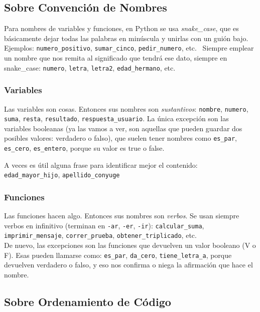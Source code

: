 \documentclass[
  letterpaper,
  DIV=11,
  numbers=noendperiod]{scrreprt}
\begin{document}
\subsection{Sobre Convención de
Nombres}\label{sobre-convenciuxf3n-de-nombres}

Para nombres de variables y funciones, en Python se usa
\emph{snake\_case}, que es básicamente dejar todas las palabras en
minúscula y unirlas con un guión bajo. Ejemplos:
\texttt{numero\_positivo}, \texttt{sumar\_cinco},
\texttt{pedir\_numero}, etc.~ Siempre emplear un nombre que nos remita
al significado que tendrá ese dato, siempre en snake\_case:
\texttt{numero}, \texttt{letra}, \texttt{letra2},
\texttt{edad\_hermano}, etc.

\subsubsection{Variables}\label{variables-1}

Las variables son cosas. Entonces sus nombres son \emph{sustantivos}:
\texttt{nombre}, \texttt{numero}, \texttt{suma}, \texttt{resta},
\texttt{resultado}, \texttt{respuesta\_usuario}. La única excepción son
las variables booleanas (ya las vamos a ver, son aquellas que pueden
guardar dos posibles valores: verdadero o falso), que suelen tener
nombres como \texttt{es\_par}, \texttt{es\_cero}, \texttt{es\_entero},
porque su valor es true o false.

A veces es útil alguna frase para identificar mejor el contenido:\\
\texttt{edad\_mayor\_hijo}, \texttt{apellido\_conyuge}

\subsubsection{Funciones}\label{funciones-1}

Las funciones hacen algo. Entonces sus nombres son \emph{verbos}. Se
usan siempre verbos en infinitivo (terminan en \texttt{-ar},
\texttt{-er}, \texttt{-ir}): \texttt{calcular\_suma},
\texttt{imprimir\_mensaje}, \texttt{correr\_prueba},
\texttt{obtener\_triplicado}, etc.\\
De nuevo, las excepciones son las funciones que devuelven un valor
booleano (V o F). Esas pueden llamarse como: \texttt{es\_par},
\texttt{da\_cero}, \texttt{tiene\_letra\_a}, porque devuelven verdadero
o falso, y eso nos confirma o niega la afirmación que hace el nombre.

\subsection{Sobre Ordenamiento de
Código}\label{sobre-ordenamiento-de-cuxf3digo}
\end{document}
